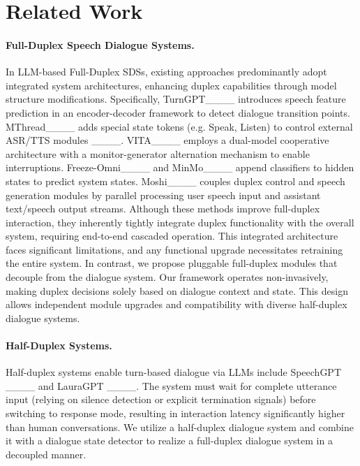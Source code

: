 \section{Related Work}
\paragraph{Full-Duplex Speech Dialogue Systems.}
 
In LLM-based Full-Duplex SDSs, existing approaches predominantly adopt integrated system architectures, enhancing duplex capabilities through model structure modifications.
Specifically, TurnGPT____ introduces speech feature prediction in an encoder-decoder framework to detect dialogue transition points. MThread____ adds special state tokens (e.g. Speak, Listen) to control external ASR/TTS modules ____.
VITA____ employs a dual-model cooperative architecture with a monitor-generator alternation mechanism to enable interruptions.
Freeze-Omni____ and MinMo____ append classifiers to hidden states to predict system states.
Moshi____ couples duplex control and speech generation modules by parallel processing user speech input and assistant text/speech output streams.
Although these methods improve full-duplex interaction, they inherently tightly integrate duplex functionality with the overall system, requiring end-to-end cascaded operation. This integrated architecture faces significant limitations, and any functional upgrade necessitates retraining the entire system. 
In contrast, we propose pluggable full-duplex modules that decouple from the dialogue system. 
Our framework operates non-invasively, making duplex decisions solely based on dialogue context and state. This design allows independent module upgrades and compatibility with diverse half-duplex dialogue systems.

\paragraph{Half-Duplex Systems.} Half-duplex systems enable turn-based dialogue via LLMs include SpeechGPT ____ and LauraGPT ____. The system must wait for complete utterance input (relying on silence detection or explicit termination signals) before switching to response mode, resulting in interaction latency significantly higher than human conversations.
We utilize a half-duplex dialogue system and combine it with a dialogue state detector to realize a full-duplex dialogue system in a decoupled manner.



